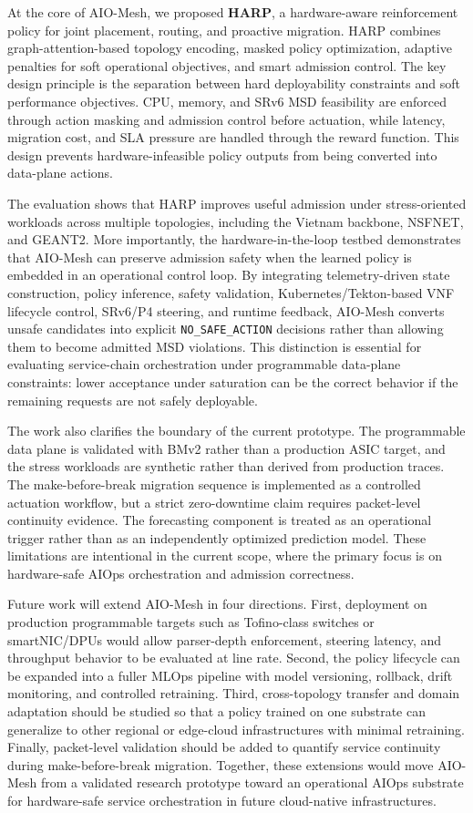 \documentclass[final,5p]{elsarticle}
\begin{document}
At the core of AIO-Mesh, we proposed \textbf{HARP}, a hardware-aware reinforcement policy for joint placement, routing, and proactive migration. HARP combines graph-attention-based topology encoding, masked policy optimization, adaptive penalties for soft operational objectives, and smart admission control. The key design principle is the separation between hard deployability constraints and soft performance objectives. CPU, memory, and SRv6 MSD feasibility are enforced through action masking and admission control before actuation, while latency, migration cost, and SLA pressure are handled through the reward function. This design prevents hardware-infeasible policy outputs from being converted into data-plane actions.

The evaluation shows that HARP improves useful admission under stress-oriented workloads across multiple topologies, including the Vietnam backbone, NSFNET, and GEANT2. More importantly, the hardware-in-the-loop testbed demonstrates that AIO-Mesh can preserve admission safety when the learned policy is embedded in an operational control loop. By integrating telemetry-driven state construction, policy inference, safety validation, Kubernetes/Tekton-based VNF lifecycle control, SRv6/P4 steering, and runtime feedback, AIO-Mesh converts unsafe candidates into explicit \texttt{NO\_SAFE\_ACTION} decisions rather than allowing them to become admitted MSD violations. This distinction is essential for evaluating service-chain orchestration under programmable data-plane constraints: lower acceptance under saturation can be the correct behavior if the remaining requests are not safely deployable.

The work also clarifies the boundary of the current prototype. The programmable data plane is validated with BMv2 rather than a production ASIC target, and the stress workloads are synthetic rather than derived from production traces. The make-before-break migration sequence is implemented as a controlled actuation workflow, but a strict zero-downtime claim requires packet-level continuity evidence. The forecasting component is treated as an operational trigger rather than as an independently optimized prediction model. These limitations are intentional in the current scope, where the primary focus is on hardware-safe AIOps orchestration and admission correctness.

Future work will extend AIO-Mesh in four directions. First, deployment on production programmable targets such as Tofino-class switches or smartNIC/DPUs would allow parser-depth enforcement, steering latency, and throughput behavior to be evaluated at line rate. Second, the policy lifecycle can be expanded into a fuller MLOps pipeline with model versioning, rollback, drift monitoring, and controlled retraining. Third, cross-topology transfer and domain adaptation should be studied so that a policy trained on one substrate can generalize to other regional or edge-cloud infrastructures with minimal retraining. Finally, packet-level validation should be added to quantify service continuity during make-before-break migration. Together, these extensions would move AIO-Mesh from a validated research prototype toward an operational AIOps substrate for hardware-safe service orchestration in future cloud-native infrastructures.
\end{document}
